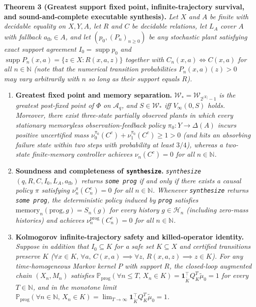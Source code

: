 \documentclass[11pt,a4paper]{article}
\providecommand{\tightlist}{\setlength{\itemsep}{2pt}\setlength{\parskip}{0pt}}
\begin{document}
\textbf{Theorem 3 (Greatest support fixed point, infinite-trajectory
survival, and sound-and-complete executable synthesis).} \emph{Let \(X\)
and \(A\) be finite with decidable equality on \(X, Y, A\), let \(R\)
and \(C\) be decidable relations, let \(L_A\) cover \(A\) with fallback
\(a_{\mathrm{fb}} \in A\), and let \((p_0, (P_n)_{n\ge 0})\) be any
stochastic plant satisfying exact support agreement
\(I_0 = \operatorname{supp} p_0\) and
\(\operatorname{supp} P_n(x,a) = \{z \in X : R(x,a,z)\}\) together with
\(C_n(x,a) \iff C(x,a)\) for all \(n \in \mathbb{N}\) (note that the
numerical transition probabilities \(P_n(x,a)(z) > 0\) may vary
arbitrarily with \(n\) so long as their support equals \(R\)).}

\begin{enumerate}
\def\labelenumi{\arabic{enumi}.}
\tightlist
\item
  \textbf{Greatest fixed point and memory separation.}
  \emph{\(\mathcal{W}_* = \mathcal{W}_{2^{|X|}-1}\) is the greatest
  post-fixed point of \(\Phi\) on \(\mathcal{A}_q\), and
  \(S \in \mathcal{W}_*\) iff \(V_\infty(0, S)\) holds. Moreover, there
  exist three-state partially observed plants in which every stationary
  memoryless observation-feedback policy \(\pi_0: Y \to \Delta(A)\)
  incurs positive uncertified mass
  \(\nu_0^{\pi_0}(C^c) + \nu_1^{\pi_0}(C^c) \ge 1 > 0\) (and hits an
  absorbing failure state within two steps with probability at least
  \(3/4\)), whereas a two-state finite-memory controller achieves
  \(\nu_n(C^c) = 0\) for all \(n \in \mathbb{N}\).}
\item
  \textbf{Soundness and completeness of \texttt{synthesize}.}
  \emph{\texttt{synthesize}\((q, R, C, I_0, L_A, a_{\mathrm{fb}})\)
  returns \texttt{some\ prog} if and only if there exists a causal
  policy \(\pi\) satisfying \(\nu_n^\pi(C_n^c) = 0\) for all
  \(n \in \mathbb{N}\). Whenever \texttt{synthesize} returns
  \texttt{some\ prog}, the deterministic policy induced by \texttt{prog}
  satisfies \(\mathrm{memory}_n(\mathrm{prog}, g) = S_n(g)\) for every
  history \(g \in \mathcal{H}_n\) (including zero-mass histories) and
  achieves \(\nu_n^{\mathrm{prog}}(C_n^c) = 0\) for all
  \(n \in \mathbb{N}\).}
\item
  \textbf{Kolmogorov infinite-trajectory safety and killed-operator
  identity.} \emph{Suppose in addition that \(I_0 \subseteq K\) for a
  safe set \(K \subseteq X\) and certified transitions preserve \(K\)
  (\(\forall x \in K,\, \forall a,\, C(x,a) \implies \forall z,\, R(x,a,z) \implies z \in K\)).
  For any time-homogeneous Markov kernel \(P\) with support \(R\), the
  closed-loop augmented chain \((X_n, M_n)\) satisfies
  \(\mathbb{P}_{\mathrm{prog}}(\forall n \le T,\, X_n \in K) = \mathbf{1}_{\widetilde{K}}^\top Q_K^T \widetilde{\mu}_0 = 1\)
  for every \(T \in \mathbb{N}\), and in the monotone limit
  \(\mathbb{P}_{\mathrm{prog}}(\forall n \in \mathbb{N},\, X_n \in K) = \lim_{T\to\infty} \mathbf{1}_{\widetilde{K}}^\top Q_K^T \widetilde{\mu}_0 = 1\).}
\end{enumerate}
\end{document}
